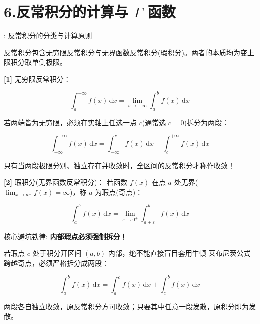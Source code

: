 \documentclass[11pt,a4paper,UTF8]{ctexart}
\begin{document}
\section{6.反常积分的计算与 $\Gamma$ 函数}

\begin{thmbox}[概念[1]: 反常积分的分类与计算原则]

反常积分包含无穷限反常积分与无界函数反常积分(瑕积分)。两者的本质均为变上限积分取单侧极限。

\textbf{[1]} 无穷限反常积分：

\begin{equation*}
\int_a^{+\infty} f(x)\,\mathrm{d}x = \lim_{b \to +\infty} \int_a^b f(x)\,\mathrm{d}x
\end{equation*}


若两端皆为无穷限，必须在实轴上任选一点 $c$(通常选 $c=0$)拆分为两段：


\begin{equation*}
\int_{-\infty}^{+\infty} f(x)\,\mathrm{d}x = \int_{-\infty}^c f(x)\,\mathrm{d}x + \int_c^{+\infty} f(x)\,\mathrm{d}x
\end{equation*}


只有当两段极限分别、独立存在并收敛时，全区间的反常积分才称作收敛！

\textbf{[2]} 瑕积分(无界函数反常积分)：
若函数 $f(x)$ 在点 $a$ 处无界($\lim_{x \to a^+} f(x) = \infty$)，称 $a$ 为瑕点(奇点)：


\begin{equation*}
\int_a^b f(x)\,\mathrm{d}x = \lim_{\varepsilon \to 0^+} \int_{a+\varepsilon}^b f(x)\,\mathrm{d}x
\end{equation*}


核心避坑铁律: \textbf{内部瑕点必须强制拆分！}

若瑕点 $c$ 处于积分开区间 $(a, b)$ 内部，绝不能直接盲目套用牛顿-莱布尼茨公式跨越奇点，必须严格拆分成两段：


\begin{equation*}
\int_a^b f(x)\,\mathrm{d}x = \int_a^c f(x)\,\mathrm{d}x + \int_c^b f(x)\,\mathrm{d}x
\end{equation*}


两段各自独立收敛，原反常积分方可收敛；只要其中任意一段发散，原积分即为发散。

\end{thmbox}
\end{document}
